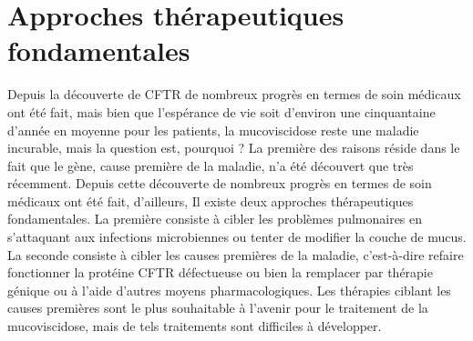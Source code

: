 
\chapter{Approches thérapeutiques fondamentales} %


\label{ch:02-02} %


Depuis la découverte de CFTR de nombreux progrès en termes de soin médicaux ont été fait, mais bien que l’espérance de vie soit d’environ une cinquantaine d’année en moyenne pour les patients, la mucoviscidose reste une maladie incurable, mais la question est, pourquoi ?
La première des raisons réside dans le fait que le gène, cause première de la maladie, n’a été découvert que très récemment. Depuis cette découverte de nombreux progrès en termes de soin médicaux ont été fait, d’ailleurs, Il existe deux approches thérapeutiques fondamentales. La première consiste à cibler les problèmes pulmonaires en s’attaquant aux infections microbiennes ou tenter de modifier la couche de mucus. La seconde consiste à cibler les causes premières de la maladie, c’est-à-dire refaire fonctionner la protéine CFTR défectueuse ou bien la remplacer par thérapie génique ou à l’aide d’autres moyens pharmacologiques. Les thérapies ciblant les causes premières sont le plus souhaitable à l’avenir pour le traitement de la mucoviscidose, mais de tels traitements sont difficiles à développer.
